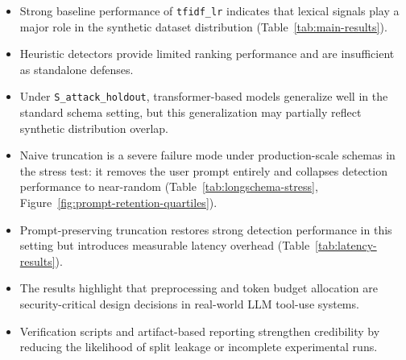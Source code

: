\begin{itemize}
    \item Strong baseline performance of \texttt{tfidf\_lr} indicates that lexical signals play a major role in the synthetic dataset distribution (Table~\ref{tab:main-results}).
    \item Heuristic detectors provide limited ranking performance and are insufficient as standalone defenses.
    \item Under \texttt{S\_attack\_holdout}, transformer-based models generalize well in the standard schema setting, but this generalization may partially reflect synthetic distribution overlap.
    \item Naive truncation is a severe failure mode under production-scale schemas in the stress test: it removes the user prompt entirely and collapses detection performance to near-random (Table~\ref{tab:longschema-stress}, Figure~\ref{fig:prompt-retention-quartiles}).
    \item Prompt-preserving truncation restores strong detection performance in this setting but introduces measurable latency overhead (Table~\ref{tab:latency-results}).
    \item The results highlight that preprocessing and token budget allocation are security-critical design decisions in real-world LLM tool-use systems.
    \item Verification scripts and artifact-based reporting strengthen credibility by reducing the likelihood of split leakage or incomplete experimental runs.
\end{itemize}
